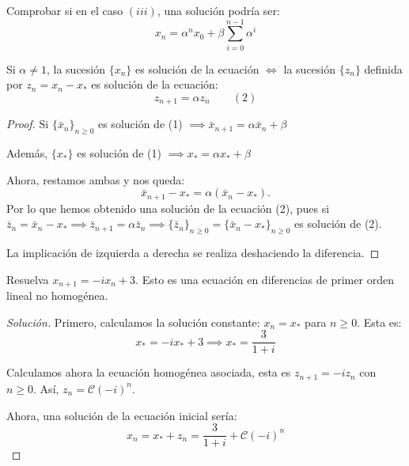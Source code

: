 \begin{ejemplo}
	Comprobar si en el caso $(iii)$, una solución podría ser: \[x_n = \alpha^n x_0 + \beta \sum_{i=0}^{n-1}\alpha^i\]
\end{ejemplo}


\begin{nprop}
	Si $\alpha \ne 1$, la sucesión $\{x_n\}$ es solución de la ecuación $\iff$ la sucesión $\{z_n\}$ definida por $z_n = x_n - x_*$ es solución de la ecuación:
	\[
	z_{n+1} =  \alpha z_n\quad \quad (2)
	\]
\end{nprop}
\begin{proof}
	Si $\{\bar{x}_n\}_{n\geq 0}$ es solución de (1) $\implies \bar{x}_{n+1}= \alpha\bar{x}_n+\beta$


	Además, $\{x_*\}$ es solución de (1) $\implies x_*= \alpha x_*+\beta$

	Ahora, restamos ambas y nos queda:
	\[
	\bar{x}_{n+1} - x_*= \alpha (\bar{x}_n - x_*).
	\]
	Por lo que hemos obtenido una solución de la ecuación (2), pues si $\bar{z}_n= \bar{x}_n - x_*\implies \bar{z}_{n+1}= \alpha \bar{z}_n \implies \{\bar{z}_n\}_{n \ge 0} = \{\bar{x}_n - x_*\}_{n \ge 0}$ es solución de (2).

	La implicación de izquierda a derecha se realiza deshaciendo la diferencia.

\end{proof}

\begin{ejemplo}
	Resuelva $x_{n+1} = -ix_n + 3$. Esto es una ecuación en diferencias de primer orden lineal no homogénea.
	\begin{proof}[Solución]
	Primero, calculamos la solución constante: $x_n = x_*$ para $n \geq 0$. Esta es:
	\[
	x_* = -i x_* +3 \implies x_* = \frac{3}{1+i}
	\]

	Calculamos ahora la ecuación homogénea asociada, esta es $z_{n+1} = -iz_n$ con $n \geq 0$. Así, $z_n =  \mathcal{C}(-i)^n$.

	Ahora, una solución de la ecuación inicial sería:
	\[
	x_n =  x_* +z_n = \frac{3}{1+i}+\mathcal{C}(-i)^n
	\]
\end{proof}

\end{ejemplo}


